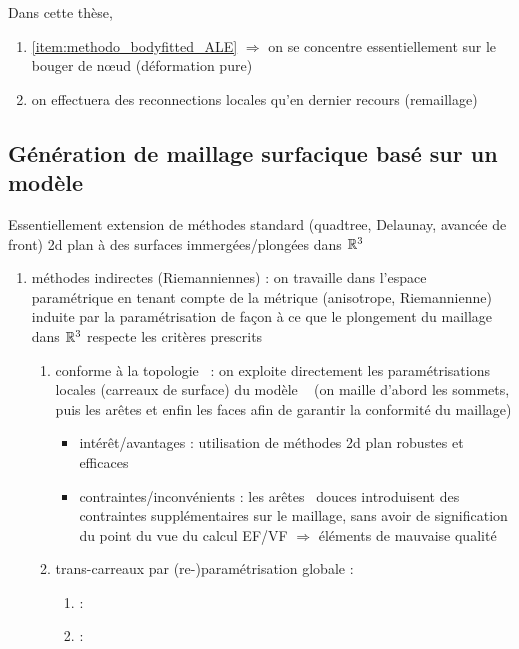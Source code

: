 Dans cette thèse,
\begin{enumerate}
	\item \autoref{item:methodo_bodyfitted_ALE} $\Rightarrow$ on se concentre essentiellement sur le bouger de n\oe ud (déformation pure)
	\item on effectuera des reconnections locales qu'en dernier recours (remaillage)
\end{enumerate}

\subsection{Génération de maillage surfacique basé sur un modèle \brep}
Essentiellement extension de méthodes standard (\ie quadtree, Delaunay, avancée de front) 2d plan à des surfaces immergées/plongées dans $\mathbb{R}^3$
\begin{enumerate}
	\item méthodes indirectes (Riemanniennes) : on travaille dans l'espace paramétrique en tenant compte de la métrique (anisotrope, Riemannienne) induite par la paramétrisation de façon à ce que le plongement du maillage dans $\mathbb{R}^3$ respecte les critères prescrits
	\begin{enumerate}
		\item conforme à la topologie \brep\ : on exploite directement les paramétrisations locales (carreaux de surface) du modèle \brep\ \cite{borouchaki2000} (on maille d'abord les sommets, puis les arêtes et enfin les faces afin de garantir la conformité du maillage)
		\begin{itemize}
			\item intérêt/avantages : utilisation de méthodes 2d plan robustes et efficaces
			\item contraintes/inconvénients : les arêtes \brep\ douces introduisent des contraintes supplémentaires sur le maillage, sans avoir de signification du point du vue du calcul EF/VF $\Rightarrow$ éléments de mauvaise qualité
		\end{itemize}
		\item trans-carreaux par (re-)paramétrisation globale : 
			\begin{enumerate}
				\item \cite{marcum1999} : %
				\item \cite{noel2002} : 

\end{enumerate}
\end{enumerate}
\end{enumerate}

